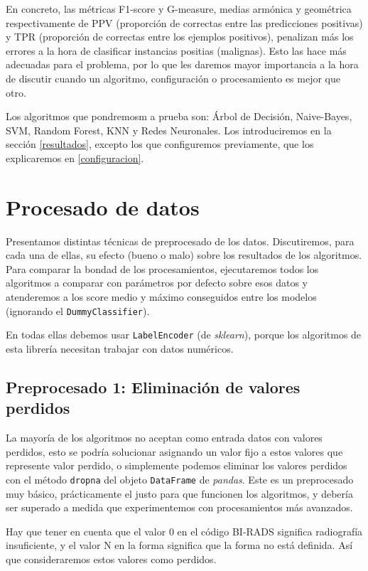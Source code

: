 \documentclass{article}
\begin{document}
En concreto, las métricas F1-score y G-measure, medias armónica y
geométrica respectivamente de PPV (proporción de correctas entre las
predicciones positivas) y TPR (proporción de correctas entre los
ejemplos positivos), penalizan más los errores a la hora de clasificar
instancias positias (malignas). Esto las hace más adecuadas para el
problema, por lo que les daremos mayor importancia a la hora de
discutir cuando un algoritmo, configuración o procesamiento es mejor
que otro.

Los algoritmos que pondremosm a prueba son: Árbol de Decisión,
Naive-Bayes, SVM, Random Forest, KNN y Redes Neuronales. Los
introduciremos en la sección \ref{resultados}, excepto los que
configuremos previamente, que los explicaremos en \ref{configuracion}.

\section{Procesado de datos}

Presentamos distintas técnicas de preprocesado de los
datos. Discutiremos, para cada una de ellas, su efecto (bueno o malo)
sobre los resultados de los algoritmos. Para comparar la bondad de los
procesamientos, ejecutaremos todos los algoritmos a comparar con
parámetros por defecto sobre esos datos y atenderemos a los score
medio y máximo conseguidos entre los modelos (ignorando el
\texttt{DummyClassifier}).

En todas ellas debemos usar \texttt{LabelEncoder} (de
\textit{sklearn}), porque los algoritmos de esta librería necesitan
trabajar con datos numéricos.

\subsection{Preprocesado 1: Eliminación de valores perdidos}

La mayoría de los algoritmos no aceptan como entrada datos con valores
perdidos, esto se podría solucionar asignando un valor fijo a estos
valores que represente valor perdido, o simplemente podemos eliminar
los valores perdidos con el método \texttt{dropna} del objeto
\texttt{DataFrame} de \textit{pandas}. Este es un preprocesado muy
básico, prácticamente el justo para que funcionen los algoritmos, y
debería ser superado a medida que experimentemos con procesamientos
más avanzados.

Hay que tener en cuenta que el valor 0 en el código BI-RADS significa
radiografía insuficiente, y el valor N en la forma significa que la
forma no está definida. Así que consideraremos estos valores como
perdidos.
\end{document}
